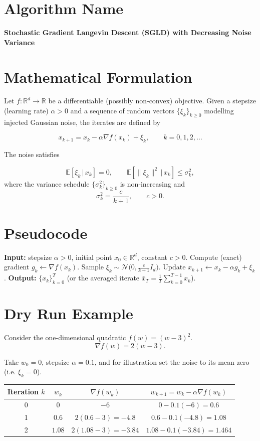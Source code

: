\documentclass{article}
\newcommand{\E}{\mathbb{E}}
\newcommand{\R}{\mathbb{R}}
\begin{document}
\section*{Algorithm Name}
\textbf{Stochastic Gradient Langevin Descent (SGLD) with Decreasing Noise Variance}

\section*{Mathematical Formulation}
Let $f:\R^{d}\rightarrow\R$ be a differentiable (possibly non‑convex) objective.  
Given a stepsize (learning rate) $\alpha>0$ and a sequence of random vectors
$\{\xi_k\}_{k\ge 0}$ modelling injected Gaussian noise, the iterates are defined by  

\[
\boxed{
x_{k+1}=x_k-\alpha \nabla f(x_k)+\xi_k,\qquad k=0,1,2,\dots
}
\tag{1}
\]

The noise satisfies  

\[
\E[\xi_k\,|\,x_k]=0,\qquad 
\E[\|\xi_k\|^2\,|\,x_k]\le \sigma_k^2,
\tag{2}
\]
where the variance schedule $\{\sigma_k^2\}_{k\ge0}$ is non‑increasing and
\[
\sigma_k^2=\frac{c}{k+1},\qquad c>0.
\tag{3}
\]

\section*{Pseudocode}
\begin{algorithm}[H]
\caption{SGLD with Decreasing Noise}
\begin{algorithmic}[1]
\STATE \textbf{Input:} stepsize $\alpha>0$, initial point $x_0\in\R^{d}$, constant $c>0$.
\STATE Compute (exact) gradient $g_k\gets\nabla f(x_k)$.
\STATE Sample $\xi_k\sim\mathcal N\bigl(0,\frac{c}{k+1}I_d\bigr)$.
\STATE Update $x_{k+1}\gets x_k-\alpha g_k+\xi_k$.
\ENDFOR
\STATE \textbf{Output:} $\{x_k\}_{k=0}^{T}$ (or the averaged iterate $\bar x_T=\frac1T\sum_{k=0}^{T-1}x_k$).
\end{algorithmic}
\end{algorithm}

\section*{Dry Run Example}
Consider the one‑dimensional quadratic $f(w)=(w-3)^2$.
\[
\nabla f(w)=2(w-3).
\]

Take $w_0=0$, stepsize $\alpha=0.1$, and for illustration set the noise to its mean zero (i.e. $\xi_k=0$).  

\begin{center}
\begin{tabular}{c|c|c|c}
Iteration $k$ & $w_k$ & $\nabla f(w_k)$ & $w_{k+1}=w_k-\alpha\nabla f(w_k)$ \\ \hline
0 & $0$ & $-6$ & $0-0.1(-6)=0.6$ \\
1 & $0.6$ & $2(0.6-3)=-4.8$ & $0.6-0.1(-4.8)=1.08$ \\
2 & $1.08$ & $2(1.08-3)=-3.84$ & $1.08-0.1(-3.84)=1.464$ \\
\end{tabular}
\end{center}
\end{document}
